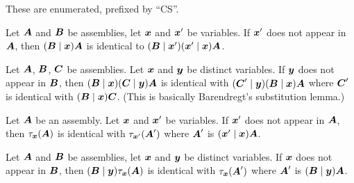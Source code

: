 These are enumerated, prefixed by ``CS''.

\begin{cs}\label{cs1}
Let $\boldsymbol{A}$ and $\boldsymbol{B}$ be assemblies, let
$\boldsymbol{x}$ and $\boldsymbol{x}'$ be variables. If
$\boldsymbol{x}'$ does not appear in $\boldsymbol{A}$, then
$(\boldsymbol{B}\mid\boldsymbol{x})\boldsymbol{A}$ is identical to $(\boldsymbol{B}\mid\boldsymbol{x}')(\boldsymbol{x}'\mid\boldsymbol{x})\boldsymbol{A}$.
\end{cs}

\begin{cs}\label{cs2}
Let $\boldsymbol{A}$, $\boldsymbol{B}$, $\boldsymbol{C}$
be assemblies. Let $\boldsymbol{x}$ and $\boldsymbol{y}$ be distinct
variables. If $\boldsymbol{y}$ does not appear in $\boldsymbol{B}$,
then $(\boldsymbol{B}\mid\boldsymbol{x})(\boldsymbol{C}\mid\boldsymbol{y})\boldsymbol{A}$
is identical with $(\boldsymbol{C}'\mid\boldsymbol{y})(\boldsymbol{B}\mid\boldsymbol{x})\boldsymbol{A}$
where $\boldsymbol{C}'$ is identical with $(\boldsymbol{B}\mid\boldsymbol{x})\boldsymbol{C}$.
(This is basically Barendregt's substitution lemma.)
\end{cs}

\begin{cs}\label{cs3}
Let $\boldsymbol{A}$ be an assembly.
Let $\boldsymbol{x}$ and $\boldsymbol{x}'$ be variables. If
$\boldsymbol{x}'$ does not appear in $\boldsymbol{A}$, then
$\tau_{\boldsymbol{x}}(\boldsymbol{A})$ is identical with $\tau_{\boldsymbol{x}'}(\boldsymbol{A}')$
where $\boldsymbol{A}'$ is $(\boldsymbol{x}'\mid\boldsymbol{x})\boldsymbol{A}$.
\end{cs}

\begin{cs}\label{cs4}
Let $\boldsymbol{A}$ and $\boldsymbol{B}$ be assemblies, let
$\boldsymbol{x}$ and $\boldsymbol{y}$ be distinct variables.
If $\boldsymbol{x}$ does not appear in $\boldsymbol{B}$,
then
$(\boldsymbol{B}\mid\boldsymbol{y})\tau_{\boldsymbol{x}}(\boldsymbol{A})$
is identical with $\tau_{\boldsymbol{x}}(\boldsymbol{A}')$ where
$\boldsymbol{A}'$ is $(\boldsymbol{B}\mid\boldsymbol{y})\boldsymbol{A}$.
\end{cs}

